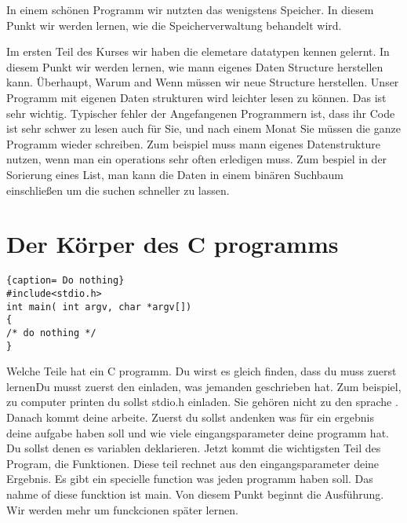 \documentclass{article}[12pt]
\begin{document}
In einem sch\"onen Programm wir nutzten das wenigstens Speicher. In diesem Punkt wir werden lernen, 
wie die Speicherverwaltung behandelt wird.

Im ersten Teil des Kurses wir haben die elemetare datatypen kennen gelernt. In diesem Punkt wir
werden lernen, wie mann eigenes Daten Structure herstellen kann. Überhaupt, Warum and Wenn müssen wir neue Structure herstellen.
Unser Programm mit eigenen Daten strukturen wird leichter lesen zu können. Das ist sehr wichtig. Typischer fehler der Angefangenen Programmern
ist, dass ihr Code ist sehr schwer zu lesen auch für Sie, und nach einem Monat Sie müssen die ganze Programm
wieder schreiben. Zum beispiel muss mann eigenes Datenstrukture nutzen, wenn man ein operations sehr often erledigen muss.
Zum bespiel in der Sorierung eines List, man kann die Daten in einem binären Suchbaum einschließen um die suchen schneller zu lassen.

\section{Der Körper des C programms}

\begin{lstlisting}{caption= Do nothing}
#include<stdio.h>
int main( int argv, char *argv[])
{
/* do nothing */
}
\end{lstlisting}
Welche Teile hat ein C programm. 
Du wirst es gleich finden, dass du muss zuerst lernenDu musst zuerst den einladen, was jemanden 
geschrieben hat. Zum beispiel, zu computer printen du sollst stdio.h einladen. Sie
gehören nicht zu den sprache . Danach kommt deine arbeite. Zuerst du sollst andenken was für ein ergebnis deine aufgabe haben soll und
wie viele eingangsparameter deine programm hat. Du sollst denen es variablen deklarieren. Jetzt kommt die wichtigsten Teil des Program, die
Funktionen. Diese teil rechnet aus den eingangsparameter deine Ergebnis. Es gibt ein specielle function was jeden programm haben
soll. Das nahme of diese funcktion ist main. Von diesem Punkt beginnt die Ausführung. Wir werden mehr um funckcionen später lernen.  
\end{document}
